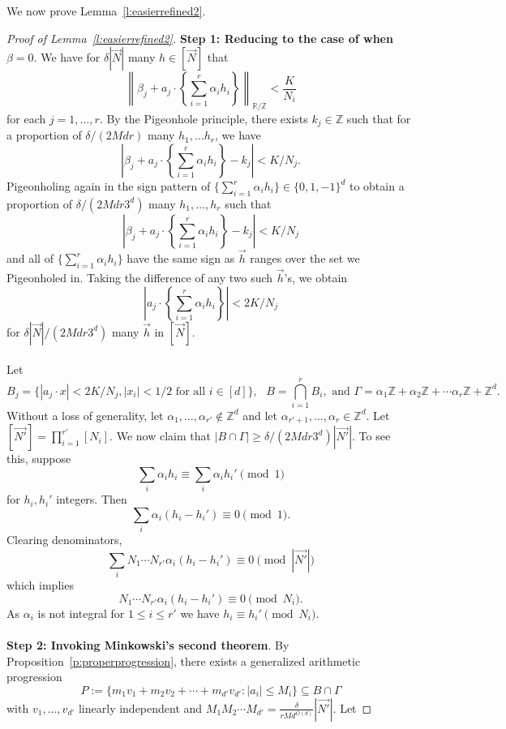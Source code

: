 \documentclass[11pt, a4paper]{amsart}
\theoremstyle{plain}
\theoremstyle{plain}
\theoremstyle{definition}
\theoremstyle{remark}
\numberwithin{equation}{section}
\numberwithin{lemma}{section}
\numberwithin{proposition}{section}
\numberwithin{corollary}{section}
\numberwithin{definition}{section}
\numberwithin{claim}{section}
\begin{document}
We now prove Lemma~\ref{l:easierrefined2}.
\begin{proof}[Proof of Lemma~\ref{l:easierrefined2}]
\textbf{Step 1: Reducing to the case of when $\beta = 0$}. We have for $\delta|\vec{N}|$ many $h \in [\vec{N}]$ that
$$\left\|\beta_j + a_j \cdot \left\{\sum_{i = 1}^r \alpha_i h_i\right\}\right\|_{\mathbb{R}/\mathbb{Z}} < \frac{K}{N_i}$$
for each $j = 1, \dots, r$. By the Pigeonhole principle, there exists $k_j \in \mathbb{Z}$ such that for a proportion of $\delta/(2Mdr)$ many $h_1, \dots h_r$, we have
$$\left|\beta_j + a_j \cdot \left\{\sum_{i = 1}^r \alpha_i h_i\right\} - k_j\right| < K/N_j.$$
Pigeonholing again in the sign pattern of $\{\sum_{i = 1}^r \alpha_i h_i\} \in \{0, 1, -1\}^d$ to obtain a proportion of $\delta/(2Mdr3^{d})$ many $h_1, \dots, h_r$ such that
$$\left|\beta_j + a_j \cdot \left\{\sum_{i = 1}^r \alpha_i h_i\right\} - k_j \right| < K/N_j$$
and all of $\{\sum_{i = 1}^r \alpha_i h_i\}$ have the same sign as $\vec{h}$ ranges over the set we Pigeonholed in. Taking the difference of any two such $\vec{h}$'s, we obtain
$$\left|a_j \cdot \left\{\sum_{i = 1}^r \alpha_i h_i\right\}\right|  < 2K/N_j$$
for $\delta|\vec{N}|/(2Mdr3^{d})$ many $\vec{h}$ in $[\vec{N}]$. \\\\
Let
$$B_j = \{|a_j \cdot x| < 2K/N_j, |x_i| < 1/2 \text{ for all } i \in [d]\}, \text{ } B = \bigcap_{i = 1}^r B_i, \text{ and }\Gamma = \alpha_1 \mathbb{Z} + \alpha_2\mathbb{Z} + \cdots \alpha_r\mathbb{Z} + \mathbb{Z}^{d}.$$
Without a loss of generality, let $\alpha_1, \dots, \alpha_{r'} \not\in \mathbb{Z}^d$ and let $\alpha_{r' + 1}, \dots, \alpha_r \in \mathbb{Z}^d$. Let $[\vec{N'}] = \prod_{i = 1}^{r'} [N_i]$. We now claim that $|B \cap \Gamma| \ge \delta/(2Mdr3^{d}) |\vec{N'}|$. To see this, suppose
$$\sum_i \alpha_i h_i \equiv \sum_i \alpha_i h_i' \pmod{1}$$
for $h_i, h_i'$ integers. Then
$$\sum_i \alpha_i (h_i - h_i') \equiv 0 \pmod{1}.$$
Clearing denominators,
$$\sum_i N_1 \cdots N_{r'} \alpha_i (h_i - h_i') \equiv 0 \pmod{|\vec{N'}|}$$
which implies
$$N_1 \cdots N_{r'} \alpha_i (h_i - h_i') \equiv 0 \pmod{N_i}.$$
As $\alpha_i$ is not integral for $1 \le i \le r'$ we have $h_i \equiv h_i' \pmod{N_i}$. \\\\
\textbf{Step 2: Invoking Minkowski's second theorem}. By Proposition~\ref{p:properprogression}, there exists a generalized arithmetic progression 
$$P := \{m_1v_1 + m_2v_2 + \cdots + m_{d'} v_{d'}: |a_i| \le M_i\} \subseteq B \cap \Gamma$$ 
with $v_1, \dots, v_{d'}$ linearly independent and $M_1M_2 \cdots M_{d'} = \frac{\delta}{rMd^{O(d)}} |\vec{N'}|$. Let 

\end{proof}
\end{document}
